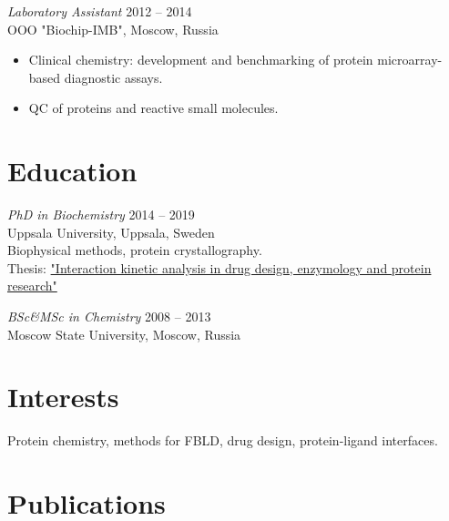 \documentclass[margin]{res}
\begin{document}
\begin{resume}
{\sl Laboratory Assistant} \hfill 2012 -- 2014 \\
OOO "Biochip-IMB", Moscow, Russia
\begin{itemize}
\setlength\itemsep{0em}
\item Clinical chemistry: development and benchmarking of protein microarray-based diagnostic assays.
\item QC of proteins and reactive small molecules.
\end{itemize}
 
\section{Education} {\sl PhD in Biochemistry} \hfill 2014 -- 2019 \\
Uppsala University, Uppsala, Sweden \\
Biophysical methods, protein crystallography. \\
Thesis: \href{http://uu.diva-portal.org/smash/record.jsf?pid=diva2%3A1256395&dswid=214}{"Interaction kinetic analysis in drug design, enzymology and protein research"}

{\sl BSc\&MSc in Chemistry} \hfill 2008 -- 2013 \\
Moscow State University, Moscow, Russia \\
                 
\section{Interests} Protein chemistry, methods for FBLD, drug design, protein-ligand interfaces.
 

\newpage

\section{Publications}
\nocite{*}
\printbibliography[heading=none]
\end{resume}
\end{document}
